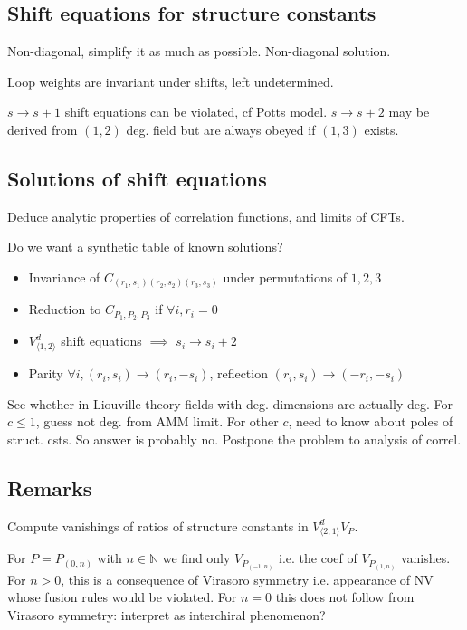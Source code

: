 \documentclass[12pt, a4paper]{article}
\theoremstyle{break}
\begin{document}
\subsection{Shift equations for structure constants}


Non-diagonal, simplify it as much as possible. Non-diagonal solution. 

Loop weights are invariant under shifts, left undetermined. 

$s\to s+1$ shift equations can be violated, cf Potts model. $s\to s+2$ may be derived from $(1,2)$ deg. field but are always obeyed if $(1,3)$ exists. 

\subsection{Solutions of shift equations}\label{sec:essc}

Deduce analytic properties of correlation functions, and limits of CFTs. 

Do we want a synthetic table of known solutions? 

\begin{itemize}
\item Invariance of $C_{(r_1,s_1)(r_2,s_2)(r_3,s_3)}$ under permutations of $1,2,3$
\item Reduction to $C_{P_1,P_2,P_3}$ if $\forall i, r_i=0$ 
 \item $V_{\langle 1,2\rangle}^d$ shift equations $\implies$ $s_i\to s_i+2$  
 \item Parity $\forall i, (r_i,s_i)\to (r_i,-s_i)$, reflection $(r_i,s_i)\to (-r_i,-s_i)$
\end{itemize}


See whether in Liouville theory fields with deg. dimensions are actually deg. For $c\leq 1$, guess not deg. from AMM limit. For other $c$, need to know about poles of struct. csts. So answer is probably no. Postpone the problem to analysis of correl. 

\subsection{Remarks}

Compute vanishings of ratios of structure constants in $V^d_{\langle 2,1\rangle}V_P$. 

For $P=P_{(0,n)}$ with $n\in\mathbb{N}$ we find only $V_{P_{(-1,n)}}$ i.e. the coef of $V_{P_{(1,n)}}$ vanishes. For $n>0$, this is a consequence of Virasoro symmetry i.e. appearance of NV whose fusion rules would be violated. For $n=0$ this does not follow from Virasoro symmetry: interpret as interchiral phenomenon?
\end{document}

